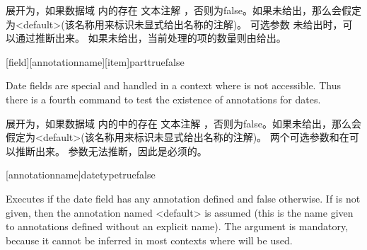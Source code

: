 \begin{ltxsyntax}
展开为，如果数据域  内的存在
文本注解 ，否则为false。如果未给出，那么会假定为<default>(该名称用来标识未显式给出名称的注解)。
可选参数 未给出时，可以通过推断出来。
如果未给出，当前处理的项的数量则由给出。

[field][annotationname][item]{part}{true}{false}


Date fields are special and handled in a context where  is not accessible. Thus there is a fourth command to test the existence of annotations for dates.

展开为，如果数据域  内的中的存在
文本注解 ，否则为false。如果未给出，那么会假定为<default>(该名称用来标识未显式给出名称的注解)。
两个可选参数和在可以推断出来。
 参数无法推断，因此是必须的。

[annotationname]{datetype}{true}{false}

Executes  if the date field  has any annotation  defined and false otherwise. If  is not given, then the annotation named <default> is assumed (this is the name given to annotations defined without an explicit name). The  argument is mandatory, because it cannot be inferred in most contexts where  will be used.

\end{ltxsyntax}
%

